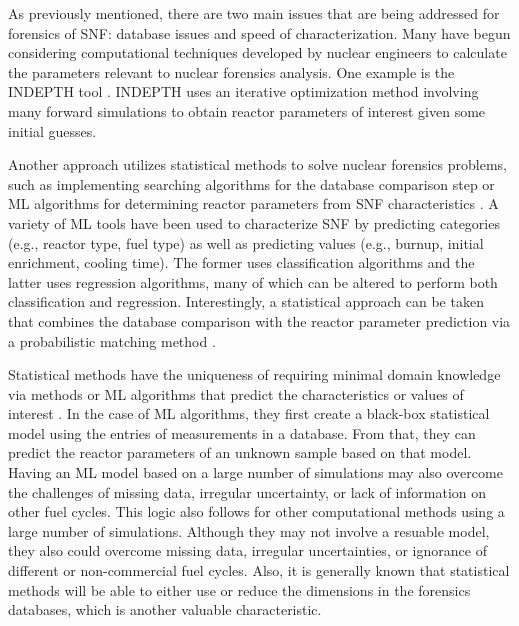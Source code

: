 As previously mentioned, there are two main issues that are being addressed for
forensics of \gls{SNF}: database issues and speed of characterization.  Many
have begun considering computational techniques developed by nuclear engineers
to calculate the parameters relevant to nuclear forensics analysis.  One
example is the \gls{INDEPTH} tool \cite{weber_2006, weber_2010, weber_2011}.
\gls{INDEPTH} uses an iterative optimization method involving many forward
simulations to obtain reactor parameters of interest given some initial
guesses. 

Another approach utilizes statistical methods to solve nuclear forensics
problems, such as implementing searching algorithms for the database comparison
step \cite{gey_search} or \gls{ML} algorithms for determining reactor
parameters from \gls{SNF} characteristics \cite{dayman_feasibility_2013,
nicolaou_2006, nicolaou_2009, nicolaou_2014, robel_2009, pu_discrimination,
jones_viz_2014, jones_snf_2014}.  A variety of \gls{ML} tools have been used to
characterize \gls{SNF} by predicting categories (e.g., reactor type, fuel type)
as well as predicting values (e.g., burnup, initial enrichment, cooling time).
The former uses classification algorithms and the latter uses regression
algorithms, many of which can be altered to perform both classification and
regression.  Interestingly, a statistical approach can be taken that combines
the database comparison with the reactor parameter prediction via a
probabilistic matching method \cite{mll_method}. 

Statistical methods have the uniqueness of requiring minimal domain knowledge
via methods or \gls{ML} algorithms that predict the characteristics or values
of interest \cite{dayman_feasibility_2013, pu_discrimination, robel_2009,
nicolaou_2006, nicolaou_2009, nicolaou_2014, jones_snf_2014, jones_viz_2014}.
In the case of \gls{ML} algorithms, they first create a black-box statistical
model using the entries of measurements in a database. From that, they can
predict the reactor parameters of an unknown sample based on that model.
Having an \gls{ML} model based on a large number of simulations may also
overcome the challenges of missing data, irregular uncertainty, or lack of
information on other fuel cycles.  This logic also follows for other
computational methods using a large number of simulations.  Although they may
not involve a resuable model, they also could overcome missing data, irregular
uncertainties, or ignorance of different or non-commercial fuel cycles.  Also,
it is generally known that statistical methods will be able to either use or
reduce the dimensions in the forensics databases, which is another valuable
characteristic. 
